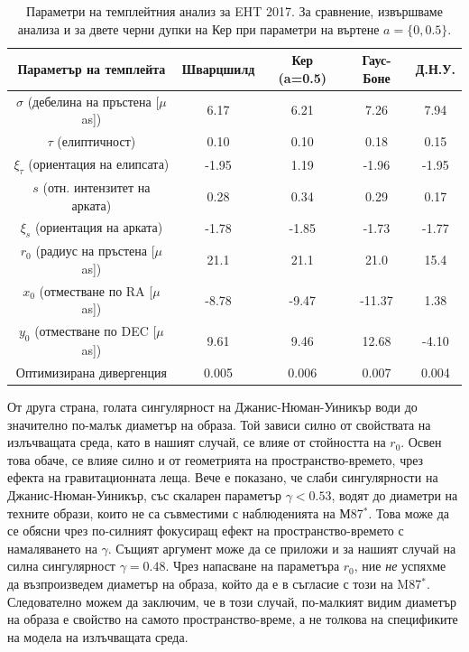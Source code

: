 \begin{table}[h!]
	\centering
	\begin{tabular}{c|c|c|c|c}
		\hline
		{Параметър на темплейта} & {Шварцшилд}&{Кер (a=0.5)}&{Гаус-Боне}&{Д.Н.У.}
		\\\hline\hline
		$\sigma$ {(\small дебелина на пръстена [$\mu$as])} & 6.17&6.21&7.26&7.94
		\\
		$\tau$ {(\small елиптичност)} & 0.10&0.10&0.18&0.15
		\\
		$\xi_\tau$ {(\small ориентация на елипсата)} & -1.95&1.19&-1.96&-1.95
		\\
		$s$ {(\small отн. интензитет на арката)} & 0.28 &0.34 & 0.29 & 0.17
		\\
		$\xi_s$ {(\small ориентация на арката)} & -1.78 &-1.85 &-1.73 & -1.77
		\\\hline
		$r_0$ {(\small радиус на пръстена [$\mu$as])} & 21.1 &21.1&21.0 & 15.4
		\\
		$x_0$ {(\small отместване по RA [$\mu$as])} & -8.78 &-9.47&-11.37 & 1.38
		\\
		$y_0$ {(\small отместване по DEC [$\mu$as])} & 9.61 & 9.46&12.68&-4.10
		\\\hline\hline
		{Оптимизирана дивергенция} & 0.005 & 0.006&  0.007 & 0.004
		\\ \hline
	\end{tabular}
	\caption[Параметри на темплейтния анализ за EHT 2017.]{Параметри на темплейтния анализ за EHT 2017. За сравнение, извършваме анализа и за двете черни дупки на Кер при параметри на въртене $a =\{0,0.5\}$.}
	\label{table:VIDA_2017}
\end{table}

От друга страна, голата сингулярност на Джанис-Нюман-Уиникър води до значително по-малък диаметър на образа. Той зависи силно от свойствата на излъчващата среда, като в нашият случай, се влияе от стойността на $r_0$. Освен това обаче, се влияе силно и от геометрията на пространство-времето, чрез ефекта на гравитационната леща. Вече е показано, че слаби сингулярности на Джанис-Нюман-Уиникър, със скаларен параметър $\gamma <0.53$, водят до диаметри на техните образи, които не са съвместими с наблюденията на М87$^*$. Това може да се обясни чрез по-силният фокусиращ ефект на пространство-времето с намаляването на $\gamma$. Същият аргумент може да се приложи и за нашият случай на силна сингулярност $\gamma = 0.48$. Чрез напасване на параметъра $r_0$, ние \emph{не} успяхме да възпроизведем диаметър на образа, който да е в съгласие с този на M87$^*$. Следователно можем да заключим, че в този случай, по-малкият видим диаметър на образа е свойство на самото пространство-време, а не толкова на спецификите на модела на излъчващата среда.\\

